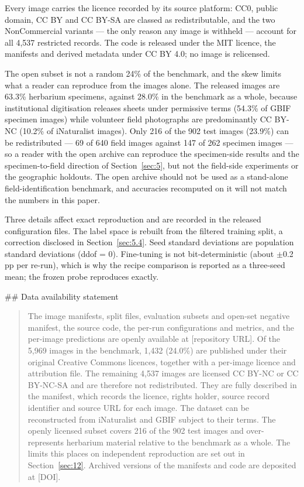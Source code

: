 \documentclass[preprint,12pt,authoryear]{elsarticle}
\begin{document}
Every image carries the licence recorded by its source platform: CC0, public domain, CC BY and CC BY-SA are classed as redistributable, and the two NonCommercial variants --- the only reason any image is withheld --- account for all 4,537 restricted records. The code is released under the MIT licence, the manifests and derived metadata under CC BY 4.0; no image is relicensed.

The open subset is not a random 24\% of the benchmark, and the skew limits what a reader can reproduce from the images alone. The released images are 63.3\% herbarium specimens, against 28.0\% in the benchmark as a whole, because institutional digitisation releases sheets under permissive terms (54.3\% of GBIF specimen images) while volunteer field photographs are predominantly CC BY-NC (10.2\% of iNaturalist images). Only 216 of the 902 test images (23.9\%) can be redistributed --- 69 of 640 field images against 147 of 262 specimen images --- so a reader with the open archive can reproduce the specimen-side results and the specimen-to-field direction of Section~\ref{sec:5}, but not the field-side experiments or the geographic holdouts. The open archive should not be used as a stand-alone field-identification benchmark, and accuracies recomputed on it will not match the numbers in this paper.

Three details affect exact reproduction and are recorded in the released configuration files. The label space is rebuilt from the filtered training split, a correction disclosed in Section~\ref{sec:5.4}. Seed standard deviations are population standard deviations (ddof = 0). Fine-tuning is not bit-deterministic (about $\pm$0.2 pp per re-run), which is why the recipe comparison is reported as a three-seed mean; the frozen probe reproduces exactly.

\#\# Data availability statement

\begin{quote}
The image manifests, split files, evaluation subsets and open-set negative manifest, the source code, the per-run configurations and metrics, and the per-image predictions are openly available at [repository URL]. Of the 5,969 images in the benchmark, 1,432 (24.0\%) are published under their original Creative Commons licences, together with a per-image licence and attribution file. The remaining 4,537 images are licensed CC BY-NC or CC BY-NC-SA and are therefore not redistributed. They are fully described in the manifest, which records the licence, rights holder, source record identifier and source URL for each image. The dataset can be reconstructed from iNaturalist and GBIF subject to their terms. The openly licensed subset covers 216 of the 902 test images and over-represents herbarium material relative to the benchmark as a whole. The limits this places on independent reproduction are set out in Section~\ref{sec:12}. Archived versions of the manifests and code are deposited at [DOI].
\end{quote}
\end{document}
